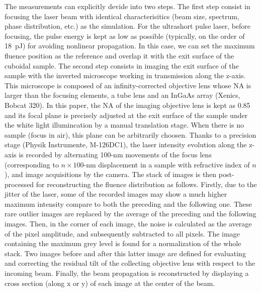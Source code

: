 \documentclass[9pt,twocolumn,twoside]{osajnl}
\begin{document}
The measurements can explicitly devide into two steps. The first step consist in focusing the laser beam with identical characterisitics (beam size, spectrum, phase distribution, etc.) as the simulation. For the ultrashort pulse laser, before focusing, the pulse energy is kept as low as possible (typically, on the order of 18~pJ) for avoiding nonlinear propagation. In this case, we can set the maximum fluence position as the reference and overlap it with the exit surface of the cuboidal sample. The second step consists in imaging the exit surface of the sample with the inverted microscope working in transmission along the z-axis. This microscope is composed of an infinity-corrected objective lens whose NA is larger than the focusing elements, a tube lens and an InGaAs array (Xenics, Bobcat 320). In this paper, the NA of the imaging objective lens is kept as 0.85 and its focal plane is precisely adjusted at the exit surface of the sample under the white light illumincation by a manual translation stage. When there is no sample (focus in air), this plane can be arbitrarily choosen. Thanks to a precision stage (Physik Instrumente, M-126DC1), the laser intensity evolution along the z-axis is recorded by alternating 100-nm movements of the focus lens (corresponding to $n\times100$-nm displacement in a sample with refractive index of $n$), and image acquisitions by the camera. The stack of images is then post-processed for reconstructing the fluence distribution as follows. Firstly, due to the jitter of the laser, some of the recorded images may show a much higher maximum intensity compare to both the preceding and the following one. These rare outlier images are replaced by the average of the preceding and the following images. Then, in the corner of each image, the noise is calculated as the average of the pixel amplitude, and subsequently subtracted to all pixels. The image containing the maximum grey level is found for a normalization of the whole stack. Two images before and after this latter image are defined for evaluating and correcting the residual tilt of the collecting objective lens with respect to the incoming beam. Finally, the beam propagation is reconstructed by displaying a cross section (along x or y) of each image at the center of the beam. 
\end{document}
